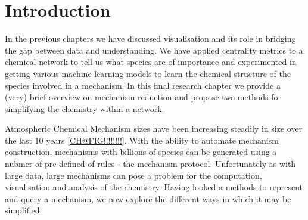
\section{Introduction}

In the previous chapters we have discussed visualisation and its role in bridging the gap between data and understanding. We have applied centrality metrics to a chemical network to tell us what species are of importance and experimented in getting various machine learning models to learn the chemical structure of the species involved in a mechanism. In this final research chapter we provide a (very) brief overview on mechanism reduction and propose two methods for simplifying the chemistry within a network. 

Atmospheric Chemical Mechanism sizes have been increasing steadily in size over the last 10 years \autoref{CH@FIG!!!!!!!!}. With the ability to automate mechanism construction, mechanisms with billions of species can be generated using a nubmer of pre-defined of rules - the mechanism protocol. Unfortunately as with large data, large mechanisms can pose a problem for the computation, visualisation and analysis of the chemistry. Having looked a methods to represent and query a mechanism, we now explore the different ways in which it may be simplified. 





